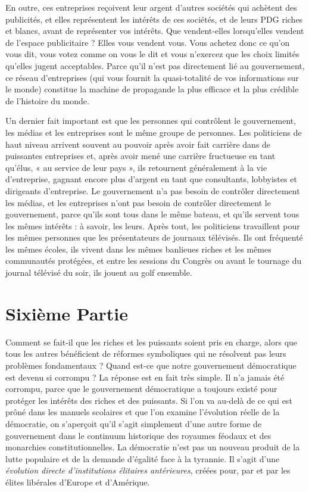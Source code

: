 En outre, ces entreprises reçoivent leur argent d'autres sociétés qui achètent des publicités, et elles représentent les intérêts de ces sociétés, et de leurs PDG riches et blancs, avant de représenter vos intérêts. Que vendent-elles lorsqu'elles vendent de l'espace publicitaire ? Elles vous vendent vous. Vous achetez donc ce qu'on vous dit, vous votez comme on vous le dit et vous n'exercez que les choix limités qu'elles jugent acceptables. Parce qu'il n'est pas directement lié au gouvernement, ce réseau d'entreprises (qui vous fournit la quasi-totalité de vos informations sur le monde) constitue la machine de propagande la plus efficace et la plus crédible de l'histoire du monde.

Un dernier fait important est que les personnes qui contrôlent le gouvernement, les médias et les entreprises sont le même groupe de personnes. Les politiciens de haut niveau arrivent souvent au pouvoir après avoir fait carrière dans de puissantes entreprises et, après avoir mené une carrière fructueuse en tant qu'élus, « au service de leur pays », ils retournent généralement à la vie d'entreprise, gagnant encore plus d'argent en tant que consultants, lobbyistes et dirigeants d'entreprise. Le gouvernement n'a pas besoin de contrôler directement les médias, et les entreprises n'ont pas besoin de contrôler directement le gouvernement, parce qu'ils sont tous dans le même bateau, et qu'ils servent tous les mêmes intérêts : à savoir, les leurs. Après tout, les politiciens travaillent pour les mêmes personnes que les présentateurs de journaux télévisés. Ils ont fréquenté les mêmes écoles, ils vivent dans les mêmes banlieues riches et les mêmes communautés protégées, et entre les sessions du Congrès ou avant le tournage du journal télévisé du soir, ils jouent au golf ensemble.

\chapter*{\textbf{Sixième Partie}}\hypertarget{sixime-partie}{}\label{sixime-partie}

Comment se fait-il que les riches et les puissants soient pris en charge, alors que tous les autres bénéficient de réformes symboliques qui ne résolvent pas leurs problèmes fondamentaux ? Quand est-ce que notre gouvernement démocratique est devenu si corrompu ? La réponse est en fait très simple. Il n'a jamais été corrompu, parce que le gouvernement démocratique a toujours existé pour protéger les intérêts des riches et des puissants. Si l'on va au-delà de ce qui est prôné dans les manuels scolaires et que l'on examine l'évolution réelle de la démocratie, on s'aperçoit qu'il s'agit simplement d'une autre forme de gouvernement dans le continuum historique des royaumes féodaux et des monarchies constitutionnelles. La démocratie n'est pas un nouveau produit de la lutte populaire et de la demande d'égalité face à la tyrannie. Il s'agit d'une \emph{évolution directe d'institutions élitaires antérieures}, créées pour, par et par les élites libérales d'Europe et d'Amérique.

